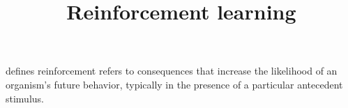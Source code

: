 \documentclass[a4paper]{article}
\title{Reinforcement learning}
\date{}
\begin{document}
\maketitle
     defines reinforcement refers to consequences that increase the likelihood of an organism's future behavior, typically in the presence of a particular antecedent stimulus.
\end{document}
